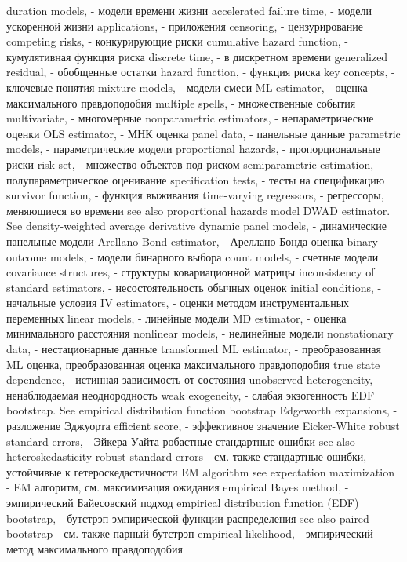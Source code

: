 duration models, - модели времени жизни
accelerated failure time, - модели ускоренной жизни
applications, - приложения
censoring, - цензурирование
competing risks, - конкурирующие риски
cumulative hazard function, - кумулятивная функция риска
discrete time, - в дискретном времени
generalized residual,  - обобщенные остатки
hazard function, - функция риска
key concepts, - ключевые понятия
mixture models, - модели смеси
ML estimator, - оценка максимального правдоподобия
multiple spells, - множественные события 
multivariate, - многомерные
nonparametric estimators, - непараметрические оценки
OLS estimator, - МНК оценка
panel data, - панельные данные
parametric models, - параметрические модели
proportional hazards, - пропорциональные риски
risk set, - множество объектов под риском
semiparametric estimation, - полупараметрическое оценивание
specification tests, - тесты на спецификацию
survivor function, - функция выживания
time-varying regressors, - регрессоры, меняющиеся во времени
see also proportional hazards model
DWAD estimator. See density-weighted average derivative
dynamic panel models, - динамические панельные модели
Arellano-Bond estimator, - Ареллано-Бонда оценка
binary outcome models, - модели бинарного выбора
count models, - счетные модели
covariance structures, - структуры ковариационной матрицы
inconsistency of standard estimators, - несостоятельность обычных оценок
initial conditions, - начальные условия
IV estimators, - оценки методом инструментальных переменных
linear models, - линейные модели
MD estimator, - оценка минимального расстояния
nonlinear models, - нелинейные модели
nonstationary data, - нестационарные данные
transformed ML estimator, - преобразованная ML оценка, преобразованная оценка максимального правдоподобия
true state dependence, - истинная зависимость от состояния
unobserved heterogeneity, - ненаблюдаемая неоднородность
weak exogeneity, - слабая экзогенность
EDF bootstrap. See empirical distribution function bootstrap
Edgeworth expansions, - разложение Эджуорта
efficient score, - эффективное значение
Eicker-White robust standard errors, - Эйкера-Уайта робастные стандартные ошибки
see also heteroskedasticity robust-standard errors - см. также стандартные ошибки, устойчивые к гетероскедастичности
EM algorithm see expectation maximization - EM алгоритм, см. максимизация ожидания
empirical Bayes method, - эмпирический Байесовский подход
empirical distribution function (EDF) bootstrap, - бутстрэп эмпирической функции распределения
see also paired bootstrap - см. также парный бутстрэп
empirical likelihood, - эмпирический метод максимального правдоподобия
